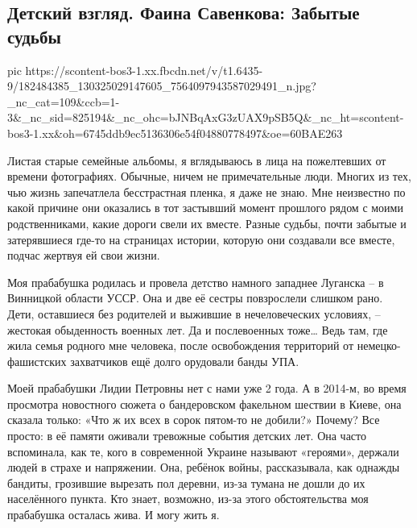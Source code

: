  
 
 
 
 
\subsection{Детский взгляд. Фаина Савенкова:  Забытые судьбы}

\ifcmt
  pic https://scontent-bos3-1.xx.fbcdn.net/v/t1.6435-9/182484385_130325029147605_7564097943587029491_n.jpg?_nc_cat=109&ccb=1-3&_nc_sid=825194&_nc_ohc=bJNBqAxG3zUAX9pSB5Q&_nc_ht=scontent-bos3-1.xx&oh=6745ddb9ec5136306e54f04880778497&oe=60BAE263
\fi

Листая старые семейные альбомы, я вглядываюсь в лица на пожелтевших от времени
фотографиях. Обычные, ничем не примечательные люди. Многих из тех, чью жизнь
запечатлела бесстрастная пленка, я даже не знаю. Мне неизвестно по какой
причине они оказались в тот застывший момент прошлого рядом с моими
родственниками, какие дороги свели их вместе. Разные судьбы, почти забытые и
затерявшиеся где-то на страницах истории, которую они создавали все вместе,
подчас жертвуя ей свои жизни.

Моя прабабушка родилась и провела детство намного западнее Луганска – в
Винницкой области УССР. Она и две её сестры повзрослели слишком рано. Дети,
оставшиеся без родителей и выжившие в нечеловеческих условиях, – жестокая
обыденность военных лет. Да и послевоенных тоже… Ведь там, где жила семья
родного мне человека, после освобождения территорий от немецко-фашистских
захватчиков ещё долго орудовали банды УПА. 

Моей прабабушки Лидии Петровны нет с нами уже 2 года. А в 2014-м, во время
просмотра новостного сюжета о бандеровском факельном шествии в Киеве, она
сказала только: «Что ж их всех в сорок пятом-то не добили?»  Почему? Все
просто: в её памяти оживали тревожные события детских лет. Она часто
вспоминала, как те, кого в современной Украине называют «героями», держали
людей в страхе и напряжении. Она, ребёнок войны, рассказывала, как однажды
бандиты, грозившие вырезать пол деревни, из-за тумана не дошли до их
населённого пункта. Кто знает, возможно, из-за этого обстоятельства моя
прабабушка осталась жива. И могу жить я.

